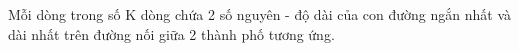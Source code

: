 Mỗi dòng trong số K dòng chứa 2 số nguyên - độ dài của con đường ngắn nhất và dài nhất trên đường nối giữa 2 thành phố tương ứng.  

\